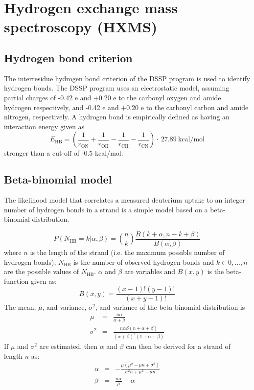 \section{Hydrogen exchange mass spectroscopy (HXMS)}

\subsection{Hydrogen bond criterion}

The interresidue hydrogen bond criterion of the DSSP program\cite{dssp} is used to identify hydrogen bonds.
The DSSP program uses an electrostatic model, assuming partial charges of -0.42 e and +0.20 e to the carbonyl oxygen and amide hydrogen respectively, and -0.42 e and +0.20 e to the carbonyl carbon and amide nitrogen, respectively.
A hydrogen bond is empirically defined as having an interaction energy given as
\begin{equation}
E_\mathrm{HB} = \left(\frac{1}{r_\mathrm{ON}} + \frac{1}{r_\mathrm{OH}} - \frac{1}{r_\mathrm{CH}} - \frac{1}{r_\mathrm{CN}} \right)\cdot\ 27.89\ \mathrm{kcal/mol}
\end{equation}
stronger than a cut-off of -0.5 kcal/mol.

\subsection{Beta-binomial model}
The likelihood model that correlates a measured deuterium uptake to an integer number of hydrogen bonds in a strand is a simple model based on a beta-binomial distribution.

\begin{equation}
P(N_\mathrm{HB} = k | \alpha, \beta) = \binom{n}{k} \frac{B(k+\alpha, n - k + \beta)}{B(\alpha, \beta)}
\end{equation}
where $n$ is the length of the strand (i.e. the maximum possible number of hydrogen bonds), $N_\mathrm{HB}$ is the number of observed hydrogen bonds and $k \in {0, ... ,n}$ are the possible values of $N_\mathrm{HB}$. $\alpha$ and $\beta$ are variables and $B(x,y)$ is the beta-function given as:
\begin{equation}
B(x,y)=\frac{(x-1)!(y-1)!}{(x+y-1)!}
\end{equation}
The mean, $\mu$, and variance, $\sigma^2$, and variance of the beta-binomial distribution is
\begin{eqnarray}
    \mu      & = & \frac{n\alpha}{\alpha + \beta}\\
    \sigma^2 & = & \frac{n\alpha\beta(n + \alpha + \beta)}{(\alpha + \beta)^2(1 + \alpha + \beta)}
\end{eqnarray}
If $\mu$ and $\sigma^2$ are estimated, then $\alpha$ and $\beta$ can then be derived for a strand of length $n$ as:
\begin{eqnarray}
    \alpha & = & -\frac{\mu(\mu^2 - \mu n + \sigma^2)}{\sigma^2 n + \mu^2 - \mu n}\\
    \beta  & = & \frac{n\alpha}{\mu} - \alpha
\end{eqnarray}


